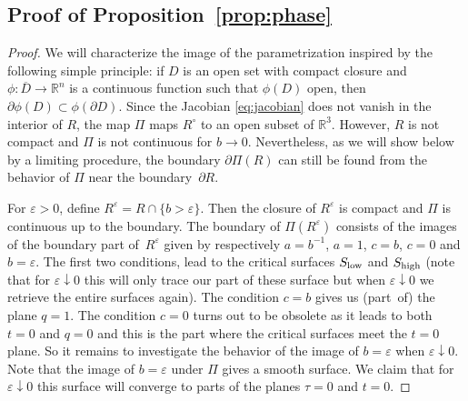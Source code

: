 \documentclass[10pt,a4paper]{amsart}
\newcommand{\eps}{\varepsilon}
\numberwithin{equation}{section}
\begin{document}
\subsection{Proof of Proposition~\ref{prop:phase}}
\begin{proof}
We will characterize the image of the parametrization inspired by the following simple principle: if $D$ is an open set with compact closure and $\phi\colon \overline D\to \mathbb R^n$ is a continuous function such that $\phi(D)$ open, then $\partial \phi(D) \subset\phi(\partial D)$. Since the Jacobian \eqref{eq:jacobian} does not vanish in the interior of $R$, the map $\Pi$ maps $R^\circ$ to an open subset of $\mathbb R^3$. However, $R$ is not compact and $\Pi$ is not continuous for $b\to 0$. Nevertheless, as we will show below by a limiting procedure, the boundary $\partial \Pi(R)$ can still be found from the behavior of $\Pi$ near the boundary~$\partial R$.

For $\eps>0$, define
$ R^{\eps}=R \cap \{ b > \eps\}.$
Then the closure of $R^{\eps}$ is compact and $\Pi$ is continuous up to the boundary. The boundary of $\Pi(R^{\eps})$ consists of the images of the boundary part of~$R^{\eps}$ given by respectively $a=b^{-1}$, $a=1$, $c=b$, $c=0$ and $b=\eps$. The first two conditions, lead to the critical surfaces $S_{{\rm low}}$ and $S_{{\rm high}}$ (note that for $\eps \downarrow 0$ this will only trace our part of these surface but when $\eps \downarrow 0$ we retrieve the entire surfaces again). The condition $c=b$ gives us (part~of) the plane $q=1$. The condition $c=0$ turns out to be obsolete as it leads to both~${t=0}$ and $q=0$ and this is the part where the critical surfaces meet the $t=0$ plane. So it remains to investigate the behavior of the image of $b=\eps$ when $\eps \downarrow 0$. Note that the image of $b=\eps$ under $\Pi$ gives a smooth surface. We claim that for $\eps \downarrow 0$ this surface will converge to parts of the planes $\tau=0$
 and $t=0$.


\end{proof}
\end{document}
